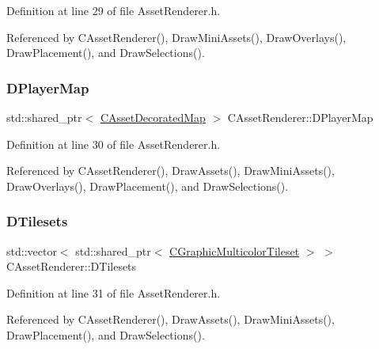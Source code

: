Definition at line 29 of file Asset\+Renderer.\+h.



Referenced by C\+Asset\+Renderer(), Draw\+Mini\+Assets(), Draw\+Overlays(), Draw\+Placement(), and Draw\+Selections().

\hypertarget{classCAssetRenderer_a422a3f7e4202e73431fba7036e494dfe}{}\label{classCAssetRenderer_a422a3f7e4202e73431fba7036e494dfe} 
\subsubsection{\texorpdfstring{D\+Player\+Map}{DPlayerMap}}
{\footnotesize\ttfamily std\+::shared\+\_\+ptr$<$ \hyperlink{classCAssetDecoratedMap}{C\+Asset\+Decorated\+Map} $>$ C\+Asset\+Renderer\+::\+D\+Player\+Map\hspace{0.3cm}{\ttfamily [protected]}}



Definition at line 30 of file Asset\+Renderer.\+h.



Referenced by C\+Asset\+Renderer(), Draw\+Assets(), Draw\+Mini\+Assets(), Draw\+Overlays(), Draw\+Placement(), and Draw\+Selections().

\hypertarget{classCAssetRenderer_ae8201de704851c1de6424a8da77b785e}{}\label{classCAssetRenderer_ae8201de704851c1de6424a8da77b785e} 
\subsubsection{\texorpdfstring{D\+Tilesets}{DTilesets}}
{\footnotesize\ttfamily std\+::vector$<$ std\+::shared\+\_\+ptr$<$ \hyperlink{classCGraphicMulticolorTileset}{C\+Graphic\+Multicolor\+Tileset} $>$ $>$ C\+Asset\+Renderer\+::\+D\+Tilesets\hspace{0.3cm}{\ttfamily [protected]}}



Definition at line 31 of file Asset\+Renderer.\+h.



Referenced by C\+Asset\+Renderer(), Draw\+Assets(), Draw\+Mini\+Assets(), Draw\+Placement(), and Draw\+Selections().

\hypertarget{classCAssetRenderer_a9975fd583c826c9905ccd080659bd3c5}{}\label{classCAssetRenderer_a9975fd583c826c9905ccd080659bd3c5} 
